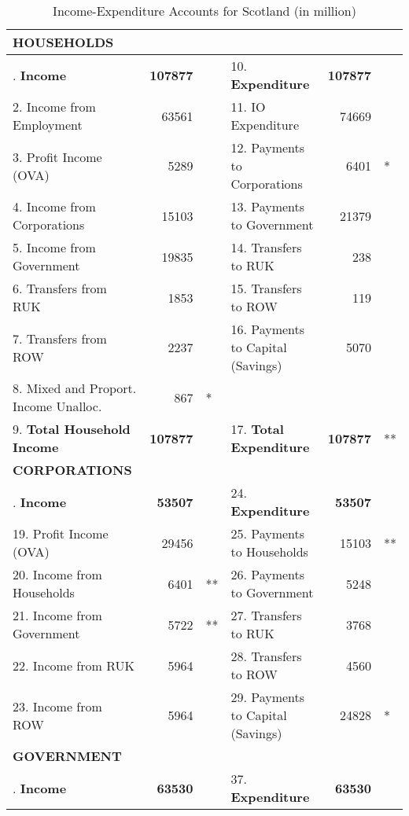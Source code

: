 \begin{table}[H] \caption{Income-Expenditure Accounts for Scotland (in \textsterling million)}
\bigskip \begin{scriptsize} \begin{centering} \begin{spacing}{1.2}
    \begin{tabular}{lrllrl}
          \toprule
    \textbf{HOUSEHOLDS} \bigstrut\\
   \hline  
\bigstrut[t]    1. \textbf{Income} & \textbf{107877} & & 10. \textbf{Expenditure} & \textbf{107877} & \\
    2. Income from Employment & 63561  &   & 11. IO Expenditure & 74669 & \\
    3. Profit Income (OVA) & 5289 & & 12. Payments to Corporations & 6401 &* \\
    4. Income from Corporations & 15103 & & 13. Payments to Government & 21379 & \\
    5. Income from Government & 19835 & & 14. Transfers to RUK & 238 & \\
    6. Transfers from RUK & 1853 & & 15. Transfers to ROW & 119 & \\
    7. Transfers from ROW & 2237 & & 16. Payments to Capital (Savings) & 5070 &\\
    8. Mixed and Proport. Income Unalloc. & 867 &* & &\\
    9. \textbf{Total Household Income} & \textbf{107877} & & 17. \textbf{Total Expenditure} & \textbf{107877} &**\\
    \hline
\bigstrut[t]    \textbf{CORPORATIONS} \bigstrut\\
    \hline
\bigstrut[t] 18. \textbf{Income} & \textbf{53507}  &   & 24. \textbf{Expenditure} & \textbf{53507} & \\
       19. Profit Income (OVA) & 29456 & & 25. Payments to Households & 15103 &** \\
       20. Income from Households & 6401 &** & 26. Payments to Government & 5248 & \\
       21. Income from Government & 5722 &** & 27. Transfers to RUK & 3768 & \\
       22. Income from RUK & 5964 & & 28. Transfers to ROW & 4560 & \\
       23. Income from ROW & 5964 & & 29. Payments to Capital (Savings) & 24828 &* \\
    \hline
    \textbf{GOVERNMENT} \bigstrut\\
    \hline
\bigstrut[t]       30. \textbf{Income} & \textbf{63530}  &   & 37. \textbf{Expenditure} & \textbf{63530} & \\

\end{tabular}
\end{spacing}
\end{centering}
\end{scriptsize}
\end{table}
